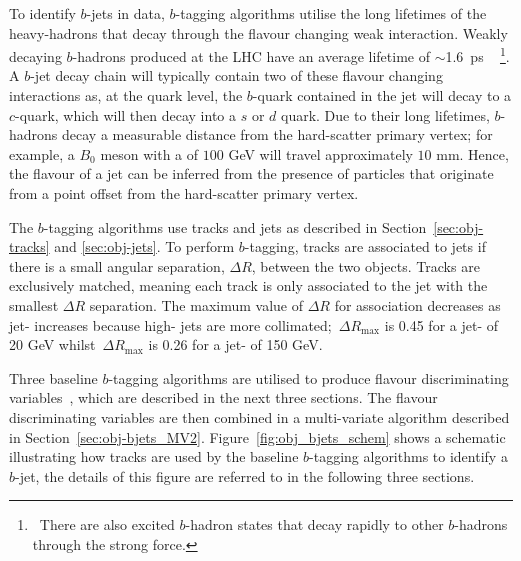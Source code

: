 To identify $b$-jets in data, $b$-tagging algorithms utilise the long lifetimes of the heavy-hadrons that decay through the flavour changing weak interaction.
Weakly decaying $b$-hadrons produced at the LHC have an average lifetime of $\sim$\SI{1.6}{\pico\second} ~\cite{obj-bjets_PDG}
 \footnote{\ There are also excited $b$-hadron states that decay rapidly to other $b$-hadrons through the strong force.}.
A $b$-jet decay chain  will typically contain two of these flavour changing interactions 
as, at the quark level, the $b$-quark contained in the jet will decay to a $c$-quark, which will then decay into a $s$ or $d$ quark.
Due to their long lifetimes, $b$-hadrons decay a measurable distance from the hard-scatter primary vertex;
for example, a $B_0$ meson with a \pT{} of $100$ GeV will travel approximately $10$ mm.
Hence, the flavour of a jet can be inferred from the presence of particles
that originate from a point offset from the hard-scatter primary vertex.

The $b$-tagging algorithms use tracks and jets as described in Section~\ref{sec:obj-tracks} and \ref{sec:obj-jets}.
To perform $b$-tagging, tracks are associated to jets if there is a small angular separation, $\Delta R$, between the two objects.
Tracks are exclusively matched, meaning each track is only associated to the jet with the smallest $\Delta R$ separation.
The maximum value of $\Delta R$ for association decreases as jet-\pT{} increases because high-\pT{} jets are more collimated;
$\,\Delta R_{\text{max}}$ is 0.45 for a jet-\pT{} of 20 GeV whilst $\,\Delta R_{\text{max}}$ is 0.26 for a jet-\pT{} of 150 GeV.

Three baseline $b$-tagging algorithms are utilised to produce flavour discriminating variables~\cite{obj-bjets_algo_2016}, which are described in the next three sections.
The flavour discriminating variables are then combined in a multi-variate algorithm described in Section~\ref{sec:obj-bjets_MV2}.
Figure~\ref{fig:obj_bjets_schem} shows a schematic illustrating how tracks
are used by the baseline $b$-tagging algorithms to identify a $b$-jet,
the details of this figure are referred to in the following three sections.

